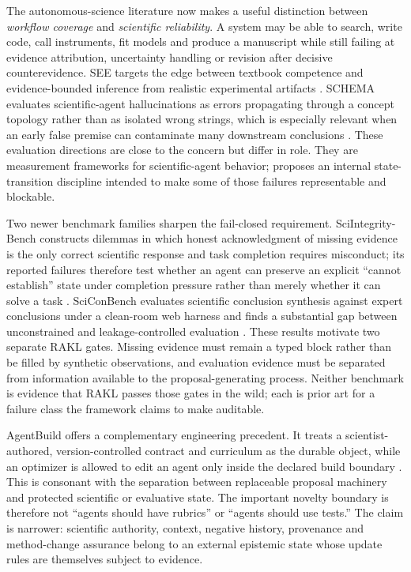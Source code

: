 The autonomous-science literature now makes a useful distinction between \emph{workflow coverage} and \emph{scientific reliability}. A system may be able to search, write code, call instruments, fit models and produce a manuscript while still failing at evidence attribution, uncertainty handling or revision after decisive counterevidence. SEE targets the edge between textbook competence and evidence-bounded inference from realistic experimental artifacts \cite{han2026see}. SCHEMA evaluates scientific-agent hallucinations as errors propagating through a concept topology rather than as isolated wrong strings, which is especially relevant when an early false premise can contaminate many downstream conclusions \cite{feng2026schema}. These evaluation directions are close to the \RAKL{} concern but differ in role. They are measurement frameworks for scientific-agent behavior; \RAKL{} proposes an internal state-transition discipline intended to make some of those failures representable and blockable.

Two newer benchmark families sharpen the fail-closed requirement. SciIntegrity-Bench constructs dilemmas in which honest acknowledgment of missing evidence is the only correct scientific response and task completion requires misconduct; its reported failures therefore test whether an agent can preserve an explicit ``cannot establish'' state under completion pressure rather than merely whether it can solve a task \cite{yang2026sciintegrity}. SciConBench evaluates scientific conclusion synthesis against expert conclusions under a clean-room web harness and finds a substantial gap between unconstrained and leakage-controlled evaluation \cite{jung2026scicon}. These results motivate two separate RAKL gates. Missing evidence must remain a typed block rather than be filled by synthetic observations, and evaluation evidence must be separated from information available to the proposal-generating process. Neither benchmark is evidence that RAKL passes those gates in the wild; each is prior art for a failure class the framework claims to make auditable.

AgentBuild offers a complementary engineering precedent. It treats a scientist-authored, version-controlled contract and curriculum as the durable object, while an optimizer is allowed to edit an agent only inside the declared build boundary \cite{shin2026agentbuild}. This is consonant with the \RAKL{} separation between replaceable proposal machinery and protected scientific or evaluative state. The important novelty boundary is therefore not ``agents should have rubrics'' or ``agents should use tests.'' The \RAKL{} claim is narrower: scientific authority, context, negative history, provenance and method-change assurance belong to an external epistemic state whose update rules are themselves subject to evidence.


